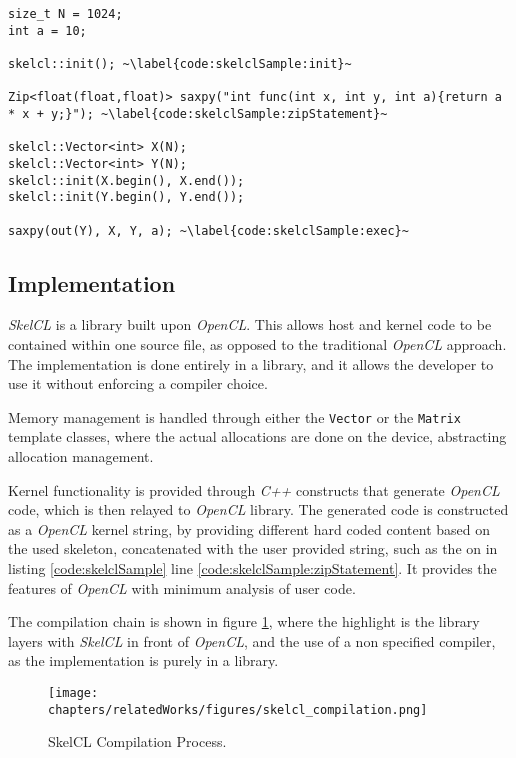 \begin{lstlisting}[caption={The \textit{SAXPY} computation in \textit{SkelCL}.}, label=code:skelclSample] 
size_t N = 1024;
int a = 10;

skelcl::init(); ~\label{code:skelclSample:init}~

Zip<float(float,float)> saxpy("int func(int x, int y, int a){return a * x + y;}"); ~\label{code:skelclSample:zipStatement}~

skelcl::Vector<int> X(N);      
skelcl::Vector<int> Y(N);
skelcl::init(X.begin(), X.end()); 
skelcl::init(Y.begin(), Y.end());

saxpy(out(Y), X, Y, a); ~\label{code:skelclSample:exec}~
\end{lstlisting}

\subsection{Implementation}
\textit{SkelCL} is a library built upon \textit{OpenCL}. This allows host and kernel code to be contained within one source file, as opposed to the traditional \textit{OpenCL} approach.
The implementation is done entirely in a library, and it allows the developer to use it without enforcing a compiler choice.

Memory management is handled through either the \texttt{Vector} or the \texttt{Matrix} template classes, where the actual allocations are done on the device, abstracting allocation management.

Kernel functionality is provided through \textit{C++} constructs that generate \textit{OpenCL} code, which is then relayed to \textit{OpenCL} library. The generated code is constructed as a \textit{OpenCL} kernel string, by providing different hard coded content based on the used skeleton, concatenated with the user provided string, such as the on in listing \ref{code:skelclSample} line \ref{code:skelclSample:zipStatement}. It provides the features of \textit{OpenCL} with minimum analysis of user code.

The compilation chain is shown in figure \ref{fig:skelclCompilation}, where the highlight is the library layers with \textit{SkelCL} in front of \textit{OpenCL}, and the use of a non specified compiler, as the implementation is purely in a library.
\begin{figure}[H]
\center
\texttt{[image: chapters/relatedWorks/figures/skelcl\_compilation.png]}
\caption{SkelCL Compilation Process.}
\label{fig:skelclCompilation}
\end{figure}

